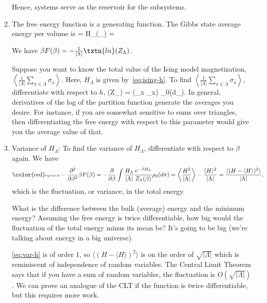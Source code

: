 \begin{enumerate}
Hence, systems serve as the reservoir for the subsystems. 

\item The free energy function is a generating function. The Gibbs state average energy per volume is 
\be
{} =  \int H_{\Lambda}(\sigma_{\Lambda})  = \frac{\partial}{\partial\beta}
\ee

We have $\beta F(\beta) = -\frac{1}{|\Lambda|}\txtn{ln}(Z_{\Lambda})$. 

Suppose you want to know the total value of the Ising model magnetization,  $\left\langle { \frac{1}{|\Lambda|} \sum_{x \in \Lambda} \sigma_x }\right\rangle$. 
Here, $H_\Lambda$ is given by~\eqref{eq:ising-h}. To find $\left\langle { \frac{1}{|\Lambda|} \sum_{x \in \Lambda} \sigma_x }\right\rangle$,  
differentiate with respect to $h$, 
\be{}(Z_{\Lambda}) = \frac{\beta}{|\Lambda|} \int (\sum_{x \in \Lambda} \sigma_x)  \rho_0(d\sigma_{\Lambda}).\ee 
In general, derivatives of the log of the partition function generate the averages you desire. For instance, if you are somewhat sensitive to sums over triangles, then differentiating the free energy with respect to this parameter would give you the average value of that. 

\item Variance of $H_{\Lambda}$: To find the variance of $H_{\Lambda}$, differentiate with respect to $\beta$ again. We have 
\begin{equation}\label{eq:var-h}\text{{\color{red}\tiny eq:var-h}}
- \frac{\partial^2}{\partial\beta^2} \beta F(\beta) = - \frac{\partial}{\partial\beta} \int \frac{H_\Lambda}{|\Lambda|} \frac{e^{-\beta H_{\Lambda}}}{Z_{\Lambda}(\beta)} \rho_0(d\sigma) = \left\langle { \frac{H^2}{|\Lambda|} }\right\rangle- \frac{\langle H \rangle^2}{|\Lambda|} = \frac{\langle (H - \langle H \rangle)^2\rangle}{|\Lambda|},
\end{equation}
which is the fluctuation, or variance, in the total energy. 

What is the difference between the bulk (average) energy and the minimum energy? Assuming the free energy is twice differentiable, how big would the fluctuation of the total energy minus its mean be? It's going to be big (we're talking about energy in a big universe). 

\eqref{eq:var-h} is of order $1$, so $\langle (H - \langle H \rangle)^2\rangle$ is on the order of $\sqrt{|\Lambda|}$ which is reminiscent of independence of random variables. 
The Central Limit Theorem says that if you have a sum of random variables, the fluctuation is  $O\left( {\sqrt{|\Lambda|}} \right)$. We can prove an analogue of the CLT if the function is twice differentiable, but this requires more work. 


\end{enumerate}
